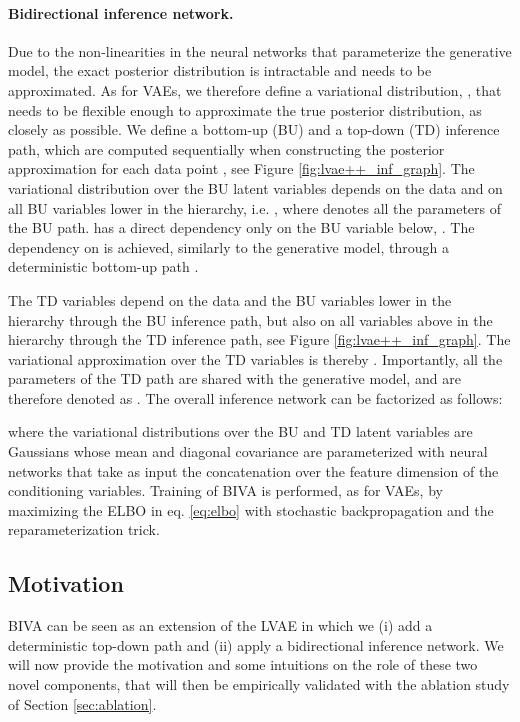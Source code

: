 \documentclass{article}
\def\nm{BIVA\xspace}
\begin{document}
\paragraph{Bidirectional inference network.}
Due to the non-linearities in the neural networks that parameterize the generative model, the exact posterior distribution  is intractable and needs to be approximated. As for VAEs, we therefore define a variational distribution, , that needs to be flexible enough to approximate the true posterior distribution, as closely as possible.
We define a bottom-up (BU) and a top-down (TD) inference path, which are computed sequentially when constructing the posterior approximation for each data point , see Figure \ref{fig:lvae++_inf_graph}. The variational distribution over the BU latent variables depends on the data  and on all BU variables lower in the hierarchy, i.e. , where  denotes all the parameters of the BU path.  has a direct dependency only on the BU variable below, . The dependency on  is achieved, similarly to the generative model, through a deterministic bottom-up path .

The TD variables depend on the data and the BU variables lower in the hierarchy through the BU inference path, but also on all variables above in the hierarchy through the TD inference path, see Figure \ref{fig:lvae++_inf_graph}. The variational approximation over the TD variables is thereby . Importantly, all the parameters of the TD path are shared with the generative model, and are therefore denoted as . The overall inference network can be factorized as follows:

where the variational distributions over the BU and TD latent variables are Gaussians whose mean and diagonal covariance are parameterized with neural networks that take as input the concatenation over the feature dimension of the conditioning variables.  
Training of \nm is performed, as for VAEs, by maximizing the ELBO in eq. \eqref{eq:elbo} with stochastic backpropagation and the reparameterization trick.


\subsection{Motivation}
\nm can be seen as an extension of the LVAE in which we (i) add a deterministic top-down path and (ii) apply a bidirectional inference network. We will now provide the motivation and some intuitions on the role of these two novel components, that will then be empirically validated with the ablation study of Section \ref{sec:ablation}. 
\end{document}
